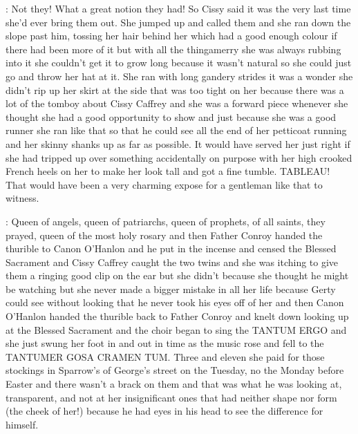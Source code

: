 :
Not they! What a great notion they had! So Cissy said it was the very
last time she'd ever bring them out. She jumped up and called them and she
ran down the slope past him, tossing her hair behind her which had a good
enough colour if there had been more of it but with all the thingamerry
she was always rubbing into it she couldn't get it to grow long because it
wasn't natural so she could just go and throw her hat at it. She ran
with long gandery strides it was a wonder she didn't rip up her skirt at
the side that was too tight on her because there was a lot of the tomboy
about Cissy Caffrey and she was a forward piece whenever she thought
she had a good opportunity to show and just because she was a good runner
she ran like that so that he could see all the end of her petticoat
running and her skinny shanks up as far as possible. It would have
served her just right if she had tripped up over something accidentally
on purpose with her high crooked French heels on her to make her look
tall and got a fine tumble. TABLEAU! That would have been a very charming
expose for a gentleman like that to witness.

:
Queen of angels, queen of patriarchs, queen of prophets, of all saints,
they prayed, queen of the most holy rosary and then Father Conroy handed
the thurible to Canon O'Hanlon and he put in the incense and censed the
Blessed Sacrament and Cissy Caffrey caught the two twins and she was
itching to give them a ringing good clip on the ear but she didn't because
she thought he might be watching but she never made a bigger mistake in
all her life because Gerty could see without looking that he never
took his eyes off of her and then Canon O'Hanlon handed the thurible
back to Father Conroy and knelt down looking up at the Blessed Sacrament
and the choir began to sing the TANTUM ERGO and she just swung her foot
in and out in time as the music rose and fell to the TANTUMER GOSA
CRAMEN TUM. Three and eleven she paid for those stockings in Sparrow's
of George's street on the Tuesday, no the Monday before Easter and there
wasn't a brack on them and that was what he was looking at, transparent,
and not at her insignificant ones that had neither shape nor form
(the cheek of her!) because he had eyes in his head to see the difference
for himself.

